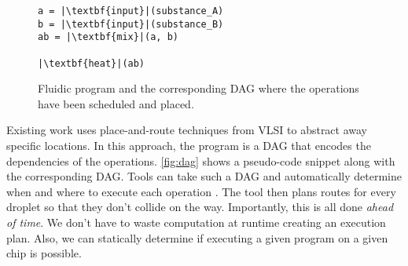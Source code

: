 \documentclass[
  10pt,
  a4paper,
  twocolumn,
]{article}
\begin{document}
\begin{figure}
  \hfill
  \begin{minipage}{0.45\linewidth}
    \begin{verbatim}
a = |\textbf{input}|(substance_A)
b = |\textbf{input}|(substance_B)
ab = |\textbf{mix}|(a, b)

|\textbf{heat}|(ab)
    \end{verbatim}
  \end{minipage}
  \hfill
  \begin{minipage}{0.45\linewidth}
  \end{minipage}

  \caption{
    Fluidic program and the corresponding DAG where the operations have been
    scheduled and placed.
  }
\label{fig:dag}
\end{figure}

Existing work uses place-and-route techniques from VLSI to abstract away specific locations.
In this approach, the program is a DAG that encodes the dependencies of the operations.
\autoref{fig:dag} shows a pseudo-code snippet along with the corresponding DAG.
Tools can take such a DAG and automatically determine when and where to execute each operation \cite{grissom2015open}.
The tool then plans routes for every droplet so that they don't collide on the way.
Importantly, this is all done \emph{ahead of time}.
We don't have to waste computation at runtime creating an execution plan.
Also, we can statically determine if executing a given program on a given chip is possible.
\end{document}
